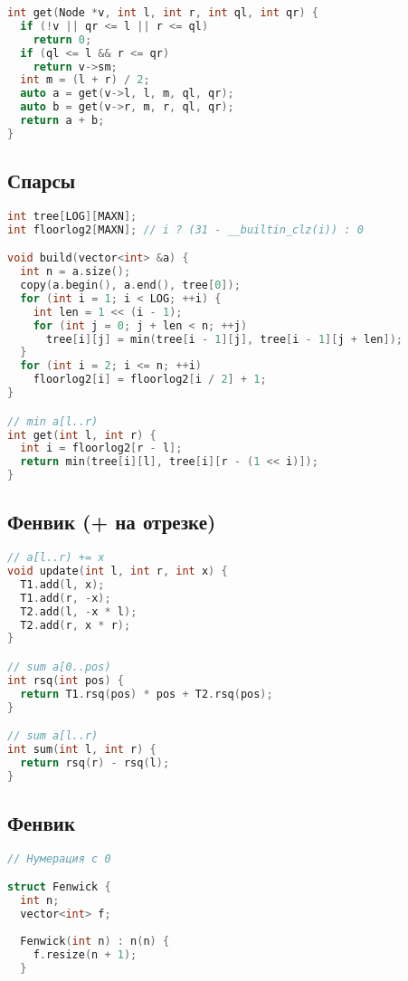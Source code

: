 \documentclass[9pt,a4paper,landscape,twosided]{extarticle}
\begin{document}
\begin{multicols*}{3}
\begin{lstlisting}[language=C++]
int get(Node *v, int l, int r, int ql, int qr) {
  if (!v || qr <= l || r <= ql)
    return 0;
  if (ql <= l && r <= qr)
    return v->sm;
  int m = (l + r) / 2;
  auto a = get(v->l, l, m, ql, qr);
  auto b = get(v->r, m, r, ql, qr);
  return a + b;
}

\end{lstlisting}

\subsection{Спарсы}
\begin{lstlisting}[language=C++]
int tree[LOG][MAXN];
int floorlog2[MAXN]; // i ? (31 - __builtin_clz(i)) : 0

void build(vector<int> &a) {
  int n = a.size();
  copy(a.begin(), a.end(), tree[0]);
  for (int i = 1; i < LOG; ++i) {
    int len = 1 << (i - 1);
    for (int j = 0; j + len < n; ++j)
      tree[i][j] = min(tree[i - 1][j], tree[i - 1][j + len]);
  }
  for (int i = 2; i <= n; ++i)
    floorlog2[i] = floorlog2[i / 2] + 1;
}

// min a[l..r)
int get(int l, int r) {
  int i = floorlog2[r - l];
  return min(tree[i][l], tree[i][r - (1 << i)]);
}

\end{lstlisting}

\subsection{Фенвик (+ на отрезке)}
\begin{lstlisting}[language=C++]
// a[l..r) += x
void update(int l, int r, int x) {
  T1.add(l, x);
  T1.add(r, -x);
  T2.add(l, -x * l);
  T2.add(r, x * r);
}

// sum a[0..pos)
int rsq(int pos) {
  return T1.rsq(pos) * pos + T2.rsq(pos);
}

// sum a[l..r)
int sum(int l, int r) {
  return rsq(r) - rsq(l);
}

\end{lstlisting}

\subsection{Фенвик}
\begin{lstlisting}[language=C++]
// Нумерация с 0

struct Fenwick {
  int n;
  vector<int> f;
 
  Fenwick(int n) : n(n) {
    f.resize(n + 1);
  }
 

\end{lstlisting}
\end{multicols*}
\end{document}
